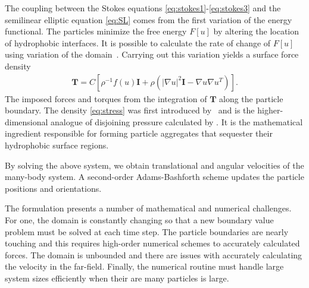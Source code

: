 The coupling between the Stokes equations \eqref{eq:stokes1}-\eqref{eq:stokes3}
and the semilinear elliptic equation \eqref{eq:SL}
comes from the first variation of the energy functional.
The particles minimize the free energy $F[u]$
by altering the location of hydrophobic interfaces. 
It is possible to calculate the rate of change of $F[u]$
using variation of the domain~\cite{Bandle2015, Schiffer1954, Grinfeld2010}.
Carrying out this variation yields a 
surface force density 
\begin{align}
  \label{eq:stress}
\mathbf{T}
= C \left[ \rho^{-1} f(u) \mathbf{I}
  + \rho  \left(|\nabla u|^2 \mathbf{I} - \nabla u  \nabla u^T\right)\right].
\end{align}
The imposed forces and torques from the integration of $\mathbf{T}$ along the
particle boundary.
The density \eqref{eq:stress}  was first introduced
by~\cite{Fu2018_SIAM} and is the higher-dimensional analogue of
disjoining pressure calculated by
\cite{MaRa76, ErLjCl89, KoNa15, Nagle17, KUZMIN2005}.
It is the mathematical ingredient responsible for forming particle
aggregates that sequester their hydrophobic surface regions.

By solving the above system, we obtain translational and angular
velocities of the many-body system. 
A second-order Adams-Bashforth scheme updates the particle positions and orientations.

The formulation presents a number of
mathematical and numerical challenges. For one, the domain is constantly
changing so that a new boundary value problem must be solved at each time step.
The particle boundaries are nearly touching and this requires
high-order numerical schemes to accurately calculated forces.
The domain is unbounded and there are issues with accurately
calculating the velocity in the far-field. 
Finally, the numerical routine must handle
large system sizes efficiently when their are many particles
is large. 


